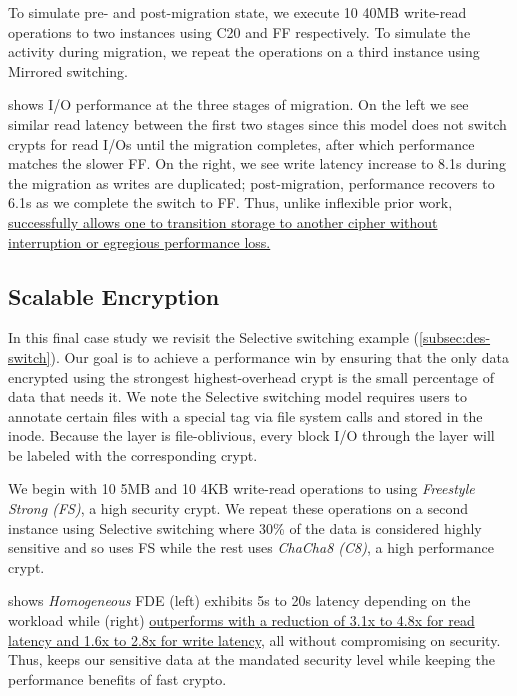 To simulate pre- and post-migration state, we execute 10 40MB write-read
operations to two \sys instances using C20 and FF respectively. To simulate the
activity during migration, we repeat the operations on a third instance using
Mirrored switching.



 shows I/O performance at the three stages of
migration. On the left we see similar read latency between the first two stages
since this model does not switch crypts for read I/Os until the migration
completes, after which performance matches the slower FF. On the right, we see
write latency increase to 8.1s during the migration as writes are duplicated;
post-migration, performance recovers to 6.1s as we complete the switch to FF.
Thus, unlike inflexible prior work, \sys \uline{successfully allows one to
transition storage to another cipher without interruption or egregious
performance loss.}


\subsection{Scalable Encryption}\label{subsec:usecase-scalable}

In this final case study we revisit the Selective switching example
(\cref{subsec:des-switch}). Our goal is to achieve a performance win by ensuring
that the only data encrypted using the strongest highest-overhead crypt is the
small percentage of data that needs it. We note the Selective switching model
requires users to annotate certain files with a special tag via file system
calls and stored in the inode. Because the \sys layer is file-oblivious, every
block I/O through the \sys layer will be labeled with the corresponding crypt.

We begin with 10 5MB and 10 4KB write-read operations to \sys using {\em
Freestyle Strong (FS)}, a high security crypt. We repeat these operations on a
second instance using Selective switching where 30\% of the data is considered
highly sensitive and so uses FS while the rest uses {\em ChaCha8 (C8)}, a high
performance crypt.



 shows {\em Homogeneous} FDE (left) exhibits 5s to
20s latency depending on the workload while \sys (right) \uline{outperforms with
a reduction of 3.1x to 4.8x for read latency and 1.6x to 2.8x for write
latency}, all without compromising on security. Thus, \sys keeps our sensitive
data at the mandated security level while keeping the performance benefits of
fast crypto.
